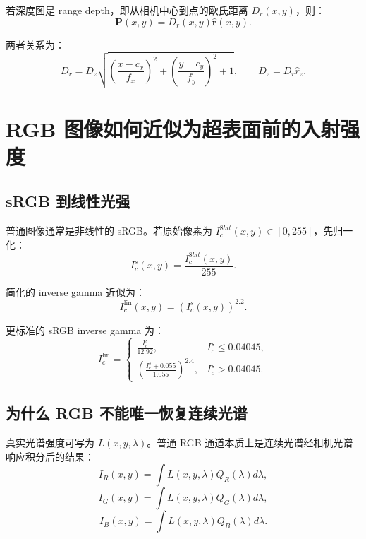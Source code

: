 \documentclass[11pt,a4paper,fontset=none]{ctexart}
\begin{document}
若深度图是 range depth，即从相机中心到点的欧氏距离 $D_r(x,y)$，则：
\begin{equation}
  \bm P(x,y)=D_r(x,y)\hat{\bm r}(x,y).
\end{equation}

两者关系为：
\begin{equation}
  D_r=
  D_z
  \sqrt{
  \left(\frac{x-c_x}{f_x}\right)^2+
  \left(\frac{y-c_y}{f_y}\right)^2+
  1
  },
  \qquad
  D_z=D_r\hat r_z .
\end{equation}

\section{RGB 图像如何近似为超表面前的入射强度}

\subsection{sRGB 到线性光强}

普通图像通常是非线性的 sRGB。若原始像素为 $I_c^{8bit}(x,y)\in[0,255]$，先归一化：
\begin{equation}
  I_c^s(x,y)=\frac{I_c^{8bit}(x,y)}{255}.
\end{equation}

简化的 inverse gamma 近似为：
\begin{equation}
  I_c^{\mathrm{lin}}(x,y)=\left(I_c^s(x,y)\right)^{2.2}.
\end{equation}

更标准的 sRGB inverse gamma 为：
\begin{equation}
I_c^{\mathrm{lin}}=
\begin{cases}
\frac{I_c^s}{12.92}, & I_c^s\le 0.04045,\\
\left(\frac{I_c^s+0.055}{1.055}\right)^{2.4}, & I_c^s>0.04045.
\end{cases}
\end{equation}

\subsection{为什么 RGB 不能唯一恢复连续光谱}

真实光谱强度可写为 $L(x,y,\lambda)$。普通 RGB 通道本质上是连续光谱经相机光谱响应积分后的结果：
\begin{equation}
  I_R(x,y)=\int L(x,y,\lambda)Q_R(\lambda)d\lambda,
\end{equation}
\begin{equation}
  I_G(x,y)=\int L(x,y,\lambda)Q_G(\lambda)d\lambda,
\end{equation}
\begin{equation}
  I_B(x,y)=\int L(x,y,\lambda)Q_B(\lambda)d\lambda.
\end{equation}
\end{document}
